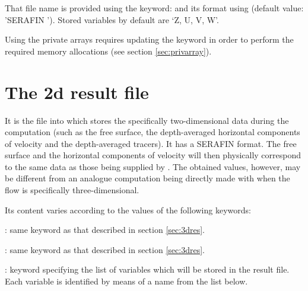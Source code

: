That file name is provided using the keyword:  and its
format using  (default value: 'SERAFIN '). Stored
variables by default are `Z, U, V, W'.

Using the private arrays requires updating the keyword  in order to perform the required memory allocations (see
section \ref{sec:privarray}).

\section{The 2d result file}

It is the file into which  stores the specifically two-dimensional
data during the computation (such as the free surface, the depth-averaged
horizontal components of velocity and the depth-averaged tracers). It has a
SERAFIN format. The free surface and the horizontal components of velocity will
then physically correspond to the same data as those being supplied by
. The obtained values, however, may be different from an analogue
computation being directly made with  when the flow is specifically
three-dimensional.

Its content varies according to the values of the following keywords:

: same keyword as that
described in section \ref{sec:3dres}.

: same keyword as that described in section
\ref{sec:3dres}.

: keyword specifying the list of
variables which will be stored in the result file. Each variable is identified
by means of a name from the list below.

